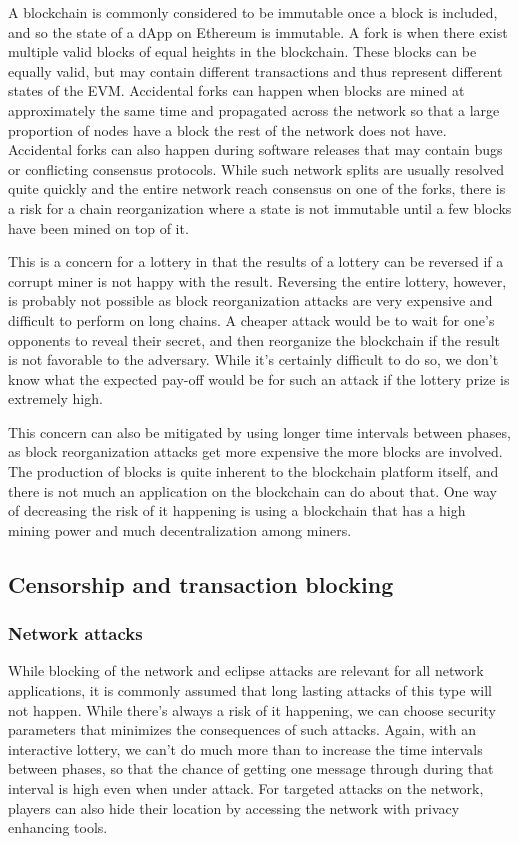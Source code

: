 A blockchain is commonly considered to be immutable once a block is included, and so the state of a dApp on Ethereum is immutable. A fork is when there exist multiple valid blocks of equal heights in the blockchain. These blocks can be equally valid, but may contain different transactions and thus represent different states of the EVM. Accidental forks can happen when blocks are mined at approximately the same time and propagated across the network so that a large proportion of nodes have a block the rest of the network does not have. Accidental forks can also happen during software releases that may contain bugs or conflicting consensus protocols. While such network splits are usually resolved quite quickly and the entire network reach consensus on one of the forks, there is a risk for a chain reorganization where a state is not immutable until a few blocks have been mined on top of it.

This is a concern for a lottery in that the results of a lottery can be reversed if a corrupt miner is not happy with the result. Reversing the entire lottery, however, is probably not possible as block reorganization attacks are very expensive and difficult to perform on long chains. A cheaper attack would be to wait for one's opponents to reveal their secret, and then reorganize the blockchain if the result is not favorable to the adversary. While it's certainly difficult to do so, we don't know what the expected pay-off would be for such an attack if the lottery prize is extremely high.

This concern can also be mitigated by using longer time intervals between phases, as block reorganization attacks get more expensive the more blocks are involved. The production of blocks is quite inherent to the blockchain platform itself, and there is not much an application on the blockchain can do about that. One way of decreasing the risk of it happening is using a blockchain that has a high mining power and much decentralization among miners.

\subsection{Censorship and transaction blocking}

\subsubsection{Network attacks} While blocking of the network and eclipse attacks are relevant for all network applications, it is commonly assumed that long lasting attacks of this type will not happen. While there's always a risk of it happening, we can choose security parameters that minimizes the consequences of such attacks. Again, with an interactive lottery, we can't do much more than to increase the time intervals between phases, so that the chance of getting one message through during that interval is high even when under attack. For targeted attacks on the network, players can also hide their location by accessing the network with privacy enhancing tools. 

